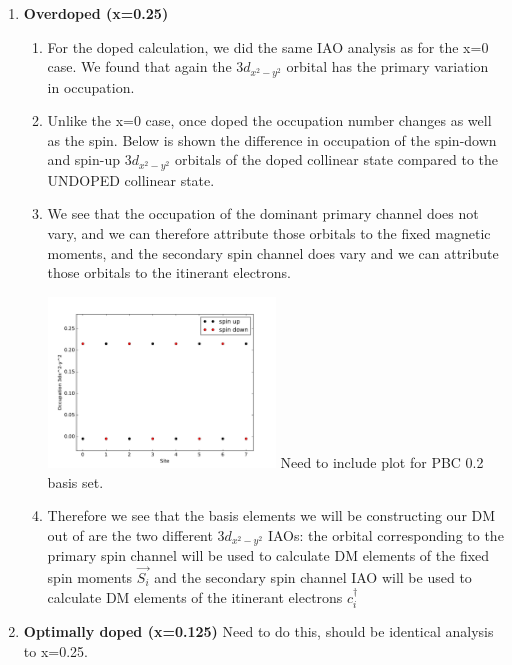 \documentclass{article}
\begin{document}
\begin{enumerate}
\color{black}
\item \textbf{Overdoped (x=0.25)}
\begin{enumerate}
\item For the doped calculation, we did the same IAO analysis as for the x=0 case. We found that again the $3d_{x^2-y^2}$ orbital has the primary variation in occupation. 

\item Unlike the x=0 case, once doped the occupation number changes as well as the spin. Below is shown the difference in occupation of the spin-down and spin-up $3d_{x^2-y^2}$ orbitals of the doped collinear state compared to the UNDOPED collinear state. 

\item We see that the occupation of the dominant primary channel does not vary, and we can therefore attribute those orbitals to the fixed magnetic moments, and the secondary spin channel does vary and we can attribute those orbitals to the itinerant electrons.

\includegraphics[width=0.5\textwidth]{../doped_fv/PBE0_8/COL0/iao/sub_occd.pdf}
\linebreak
\color{red} Need to include plot for PBC 0.2 basis set.

\color{black}
\item Therefore we see that the basis elements we will be constructing our DM out of are the two different $3d_{x^2-y^2}$ IAOs: the orbital corresponding to the primary spin channel will be used to calculate DM elements of the fixed spin moments $\vec{S_i}$ and the secondary spin channel IAO will be used to calculate DM elements of the itinerant electrons $c_i^\dagger$
\end{enumerate}

\item \textbf{Optimally doped (x=0.125)}
\color{red} Need to do this, should be identical analysis to x=0.25.
\end{enumerate}

\color{blue}
\end{document}
